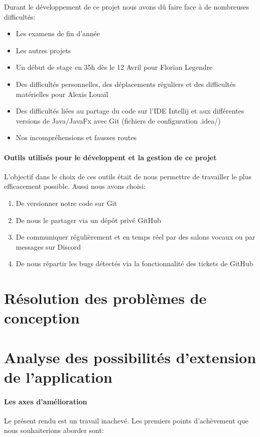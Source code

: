 \documentclass[./standalone.tex]{subfiles}
\begin{document}
Durant le développement de ce projet nous avons dû faire face à de nombreuses difficultés:
\begin{itemize}
	\item Les examens de fin d'année
	\item Les autres projets
	\item Un début de stage en 35h dès le 12 Avril pour Florian Legendre
	\item Des difficultés personnelles, des déplacements réguliers et des difficultés matérielles pour Alexis Louail
	\item Des difficultés liées au partage du code sur l'IDE Intellij et aux différentes versions de Java/JavaFx avec Git (fichiers de configuration .idea/)
	\item Nos incompréhensions et fausses routes\\
\end{itemize}

\paragraph{Outils utilisés pour le développent et la gestion de ce projet\\}
L'objectif dans le choix de ces outils était de nous permettre de travailler le plus efficacement possible. Aussi nous avons choisi:
\begin{enumerate}
	\item De versionner notre code sur Git
	\item De nous le partager via un dépôt privé GitHub
	\item De communiquer régulièrement et en temps réel par des salons vocaux ou par messages sur Discord
	\item De nous répartir les bugs détectés via la fonctionnalité des tickets de GitHub
\end{enumerate}


\section{Résolution des problèmes de conception}


\newpage

\section{Analyse des possibilités d’extension de l’application}
\medskip

\paragraph{Les axes d'amélioration\\}
Le présent rendu est un travail inachevé. Les premiers points d'achèvement que nous souhaiterions aborder sont:
\end{document}
